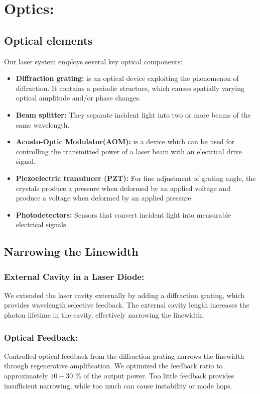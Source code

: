 \documentclass[12pt]{article}
\begin{document}
\section{Optics:}
\subsection{Optical elements}
    Our laser system employs several key optical components:
    \begin{itemize}
        \item \textbf{Diffraction grating:} is an optical device exploiting the phenomenon of diffraction. It contains a periodic structure, which causes spatially varying optical amplitude and/or phase changes.\cite{Paschotta_2013_diffraction_gratings}
        \item \textbf{Beam splitter:} They separate incident light into two or more beams of the same wavelength. 
        \item \textbf{Acusto-Optic Modulator(AOM):} is a device which can be used for controlling the transmitted power of a laser beam with an electrical drive signal.\cite{Paschotta_2019_acousto_optic_modulators}
        \item \textbf{Piezoelectric transducer (PZT):} For fine adjustment of grating angle, the crystals produce a pressure when deformed by an applied voltage and produce a voltage when deformed by an applied pressure
        \item \textbf{Photodetectors:} Sensors that convert incident light into measurable electrical signals.
    \end{itemize}

\subsection{Narrowing the Linewidth}

\subsubsection{External Cavity in a Laser Diode:} 
    We extended the laser cavity externally by adding a diffraction grating, which provides wavelength selective feedback. The external cavity length  increases the photon lifetime in the cavity, effectively narrowing the linewidth. 

\subsubsection{Optical Feedback:} 
    Controlled optical feedback from the diffraction grating narrows the linewidth through regenerative amplification. We optimized the feedback ratio to approximately $10-30$ \% of the output power. Too little feedback provides insufficient narrowing, while too much can cause instability or mode hops.
\end{document}
